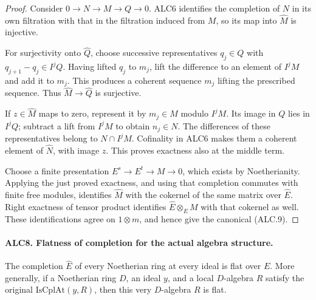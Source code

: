 \begin{proof}
Consider \(0\to N\to M\to Q\to0\).  ALC6 identifies
the completion of \(N\) in its own filtration with that in
the filtration induced from \(M\), so its map into
\(\widehat M\) is injective.

For surjectivity onto \(\widehat Q\), choose successive
representatives \(q_j\in Q\) with
\(q_{j+1}-q_j\in I^jQ\).  Having lifted \(q_j\) to
\(m_j\), lift the difference to an element of \(I^jM\)
and add it to \(m_j\).  This produces a coherent sequence
\(m_j\) lifting the prescribed sequence.  Thus
\(\widehat M\to\widehat Q\) is surjective.

If \(z\in\widehat M\) maps to zero, represent it by
\(m_j\in M\) modulo \(I^jM\).  Its image in \(Q\)
lies in \(I^jQ\); subtract a lift from \(I^jM\) to obtain
\(n_j\in N\).  The differences of these representatives
belong to \(N\cap I^jM\).  Cofinality in ALC6 makes them
a coherent element of \(\widehat N\), with image \(z\).
This proves exactness also at the middle term.

Choose a finite presentation \(E^s\to E^t\to M\to0\),
which exists by Noetherianity.  Applying the just proved
exactness, and using that completion commutes with finite
free modules, identifies \(\widehat M\) with the cokernel
of the same matrix over \(\widehat E\).  Right exactness
of tensor product identifies \(\widehat E\otimes_E M\)
with that cokernel as well.  These identifications agree on
\(1\otimes m\), and hence give the canonical (ALC.9).
\end{proof}

\paragraph{ALC8. Flatness of completion for the actual algebra structure.}
\label{claim:ALC8}
The completion \(\widehat E\) of every Noetherian ring at
every ideal is flat over \(E\).  More generally, if a
Noetherian ring \(D\), an ideal \(y\), and a local
\(D\)-algebra \(R\) satisfy the original
\(\mathrm{IsCplAt}(y,R)\), then this very \(D\)-algebra
\(R\) is flat.

